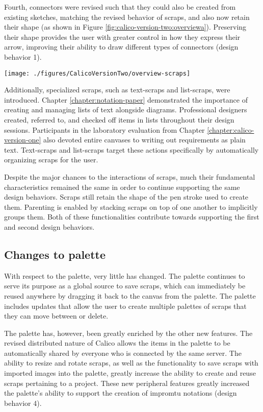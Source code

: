 Fourth, connectors were revised such that they could also be created from existing sketches, matching the revised behavior of scraps, and also now retain their shape (as shown in Figure \ref{fig:calico-version-two:overviewa}). Preserving their shape provides the user with greater control in how they express their arrow, improving their ability to draw different types of connectors (design behavior 1). 

\begin{figure*}[tbh]
  \centering
  \texttt{[image: ./figures/CalicoVersionTwo/overview-scraps]}
  \caption{Scraps.}
  \label{fig:calico-version-two:overviewa}
\end{figure*}

Additionally, specialized scraps, such as text-scraps and list-scraps, were introduced. Chapter \ref{chapter:notation-paper} demonstrated the importance of creating and managing lists of text alongside diagrams. Professional designers created, referred to, and checked off items in lists throughout their design sessions. Participants in the laboratory evaluation from Chapter \ref{chapter:calico-version-one} also devoted entire canvases to writing out requirements as plain text. Text-scraps and list-scraps target these actions specifically by automatically organizing scraps for the user.

Despite the major chances to the interactions of scraps, much their fundamental characteristics remained the same in order to continue supporting the same design behaviors. Scraps still retain the shape of the pen stroke used to create them. Parenting is enabled by stacking scraps on top of one another to implicitly groups them. Both of these functionalities contribute towards supporting the first and second design behaviors.

\subsection{Changes to palette}

With respect to the palette, very little has changed. The palette continues to serve its purpose as a global source to save scraps, which can immediately be reused anywhere by dragging it back to the canvas from the palette. The palette includes updates that allow the user to create multiple palettes of scraps that they can move between or delete. 

The palette has, however, been greatly enriched by the other new features. The revised distributed nature of Calico allows the items in the palette to be automatically shared by everyone who is connected by the same server. The ability to resize and rotate scraps, as well as the functionality to save scraps with imported images into the palette, greatly increase the ability to create and reuse scraps pertaining to a project. These new peripheral features greatly increased the palette's ability to support the creation of impromtu notations (design behavior 4).

